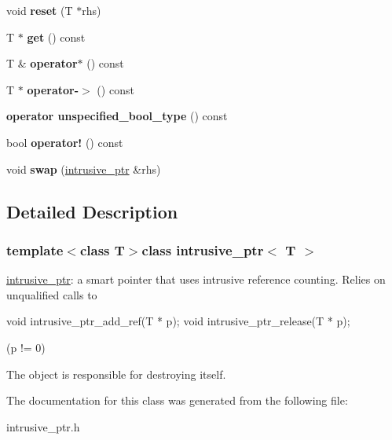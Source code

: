 \begin{DoxyCompactItemize}
\item 
\hypertarget{classintrusive__ptr_a81e2fb688afba02de9ecf2006caeb62e}{void {\bfseries reset} (T $\ast$rhs)}\label{classintrusive__ptr_a81e2fb688afba02de9ecf2006caeb62e}

\item 
\hypertarget{classintrusive__ptr_a70192c07e3ff5035942095a5d2d97c34}{T $\ast$ {\bfseries get} () const }\label{classintrusive__ptr_a70192c07e3ff5035942095a5d2d97c34}

\item 
\hypertarget{classintrusive__ptr_a63f7f0b02c547127f9f68ecdb01f7aa6}{T \& {\bfseries operator$\ast$} () const }\label{classintrusive__ptr_a63f7f0b02c547127f9f68ecdb01f7aa6}

\item 
\hypertarget{classintrusive__ptr_a4756c9e89a1a057e2c911d8224197d31}{T $\ast$ {\bfseries operator-\/$>$} () const }\label{classintrusive__ptr_a4756c9e89a1a057e2c911d8224197d31}

\item 
\hypertarget{classintrusive__ptr_a1a71711829594617e226fada9b7ef351}{{\bfseries operator unspecified\-\_\-bool\-\_\-type} () const }\label{classintrusive__ptr_a1a71711829594617e226fada9b7ef351}

\item 
\hypertarget{classintrusive__ptr_aee167762c6829dac96f664b4ab505e39}{bool {\bfseries operator!} () const }\label{classintrusive__ptr_aee167762c6829dac96f664b4ab505e39}

\item 
\hypertarget{classintrusive__ptr_a95826a79f706bc5c6b9fd28ae334e974}{void {\bfseries swap} (\hyperlink{classintrusive__ptr}{intrusive\-\_\-ptr} \&rhs)}\label{classintrusive__ptr_a95826a79f706bc5c6b9fd28ae334e974}

\end{DoxyCompactItemize}


\subsection{Detailed Description}
\subsubsection*{template$<$class T$>$class intrusive\-\_\-ptr$<$ T $>$}

\hyperlink{classintrusive__ptr}{intrusive\-\_\-ptr}\-: a smart pointer that uses intrusive reference counting. Relies on unqualified calls to 
\begin{DoxyPre}
     void intrusive\_ptr\_add\_ref(T * p);
     void intrusive\_ptr\_release(T * p);
\end{DoxyPre}
 (p != 0)

The object is responsible for destroying itself. 

The documentation for this class was generated from the following file\-:\begin{DoxyCompactItemize}
\item 
intrusive\-\_\-ptr.\-h\end{DoxyCompactItemize}
